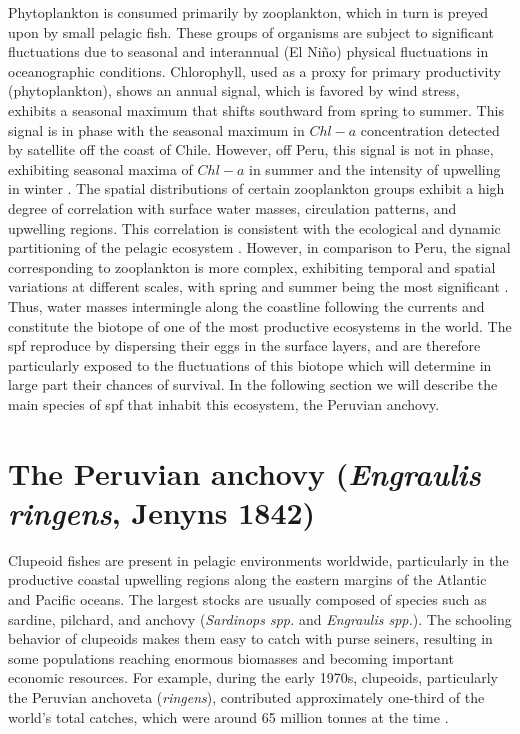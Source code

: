 Phytoplankton is consumed primarily by zooplankton, which in turn is preyed upon by small pelagic fish. These groups of organisms are subject to significant fluctuations due to seasonal and interannual (El Ni\~{n}o) physical fluctuations in oceanographic conditions. Chlorophyll, used as a proxy for primary productivity (phytoplankton), shows an annual signal, which is favored by wind stress, exhibits a seasonal maximum that shifts southward from spring to summer. This signal is in phase with the seasonal maximum in $Chl-a$ concentration detected by satellite off the coast of Chile. However, off Peru, this signal is not in phase, exhibiting seasonal maxima of $Chl-a$ in summer and the intensity of upwelling in winter \citep{EcheAumo2008,CorrHorm2012}. The spatial distributions of certain zooplankton groups exhibit a high degree of correlation with surface water masses, circulation patterns, and upwelling regions. This correlation is consistent with the ecological and dynamic partitioning of the pelagic ecosystem \citep{FernFarb2006}. However, in comparison to Peru, the signal corresponding to zooplankton is more complex, exhibiting temporal and spatial variations at different scales, with spring and summer being the most significant \citep{AronAyon2009,AronGrad2019}.\\

Thus, water masses intermingle along the coastline following the currents and constitute the biotope of one of the most productive ecosystems in the world. The \acrfull{spf} reproduce by dispersing their eggs in the surface layers, and are therefore particularly exposed to the fluctuations of this biotope which will determine in large part their chances of survival. In the following section we will describe the main species of \acrshort{spf} that inhabit this ecosystem, the Peruvian anchovy.\\

\clearpage
\section{The Peruvian anchovy (\textit{Engraulis ringens}, Jenyns 1842)}\label{Chap1PeruAnch}

Clupeoid fishes are present in pelagic environments worldwide, particularly in the productive coastal upwelling regions along the eastern margins of the Atlantic and Pacific oceans. The largest stocks are usually composed of species such as sardine, pilchard, and anchovy (\textit{Sardinops spp.} and \textit{Engraulis spp.}). The schooling behavior of clupeoids makes them easy to catch with purse seiners, resulting in some populations reaching enormous biomasses and becoming important economic resources. For example, during the early 1970s, clupeoids, particularly the Peruvian anchoveta (\textit{\gls{ringens}}), contributed approximately one-third of the world's total catches, which were around 65 million tonnes at the time \citep{ColeMcGl1998}.\\

